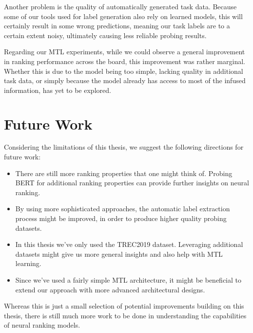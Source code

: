 Another problem is the quality of automatically generated task data. Because some of our tools used for label generation also rely on learned models, this will certainly result in some wrong predictions, meaning our task labels are to a certain extent noisy, ultimately causing less reliable probing results.

Regarding our MTL experiments, while we could observe a general improvement in ranking performance across the board, this improvement was rather marginal. Whether this is due to the model being too simple, lacking quality in additional task data, or simply because the model already has access to most of the infused information, has yet to be explored.

\section{Future Work}
\label{sec:future}
Considering the limitations of this thesis, we suggest the following directions for future work:
\begin{itemize}
    \item There are still more ranking properties that one might think of. Probing BERT for additional ranking properties can provide further insights on neural ranking.
    \item By using more sophisticated approaches, the automatic label extraction process might be improved, in order to produce higher quality probing datasets.
    \item In this thesis we've only used the TREC2019 dataset. Leveraging additional datasets might give us more general insights and also help with MTL learning.
    \item Since we've used a fairly simple MTL architecture, it might be beneficial to extend our approach with more advanced architectural designs.
\end{itemize}
Whereas this is just a small selection of potential improvements building on this thesis, there is still much more work to be done in understanding the capabilities of neural ranking models.
